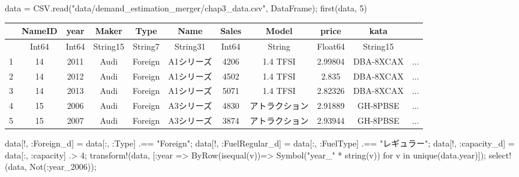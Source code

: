 \documentclass[
  letterpaper,
  DIV=11,
  numbers=noendperiod]{scrreprt}
\newenvironment{Shaded}{\begin{snugshade}}{\end{snugshade}}
\newcommand{\DataTypeTok}[1]{\textcolor[rgb]{0.68,0.00,0.00}{#1}}
\newcommand{\FloatTok}[1]{\textcolor[rgb]{0.68,0.00,0.00}{#1}}
\newcommand{\FunctionTok}[1]{\textcolor[rgb]{0.28,0.35,0.67}{#1}}
\newcommand{\KeywordTok}[1]{\textcolor[rgb]{0.00,0.23,0.31}{#1}}
\newcommand{\NormalTok}[1]{\textcolor[rgb]{0.00,0.23,0.31}{#1}}
\newcommand{\OperatorTok}[1]{\textcolor[rgb]{0.37,0.37,0.37}{#1}}
\newcommand{\StringTok}[1]{\textcolor[rgb]{0.13,0.47,0.30}{#1}}
\begin{document}
\begin{Shaded}
\begin{Highlighting}[]
\NormalTok{data }\OperatorTok{=}\NormalTok{ CSV.}\FunctionTok{read}\NormalTok{(}\StringTok{"data/demand\_estimation\_merger/chap3\_data.csv"}\NormalTok{, DataFrame);}
\FunctionTok{first}\NormalTok{(data, }\FloatTok{5}\NormalTok{)}
\end{Highlighting}
\end{Shaded}

\begin{tabular}{r|cccccccccc}
    & NameID & year & Maker & Type & Name & Sales & Model & price & kata & \\
    \hline
    & Int64 & Int64 & String15 & String7 & String31 & Int64 & String & Float64 & String15 & \\
    \hline
    1 & 14 & 2011 & Audi & Foreign & A1シリーズ & 4206 & 1.4 TFSI & 2.99804 & DBA-8XCAX & $\dots$ \\
    2 & 14 & 2012 & Audi & Foreign & A1シリーズ & 4502 & 1.4 TFSI & 2.835 & DBA-8XCAX & $\dots$ \\
    3 & 14 & 2013 & Audi & Foreign & A1シリーズ & 5071 & 1.4 TFSI & 2.82326 & DBA-8XCAX & $\dots$ \\
    4 & 15 & 2006 & Audi & Foreign & A3シリーズ & 4830 & アトラクション & 2.91889 & GH-8PBSE & $\dots$ \\
    5 & 15 & 2007 & Audi & Foreign & A3シリーズ & 3874 & アトラクション & 2.93944 & GH-8PBSE & $\dots$ \\
\end{tabular}

\begin{Shaded}
\begin{Highlighting}[]
\NormalTok{data[!, }\OperatorTok{:}\NormalTok{Foreign\_d] }\OperatorTok{=}\NormalTok{ data[}\OperatorTok{:}\NormalTok{, }\OperatorTok{:}\DataTypeTok{Type}\NormalTok{] }\OperatorTok{.==} \StringTok{"Foreign"}\NormalTok{;}
\NormalTok{data[!, }\OperatorTok{:}\NormalTok{FuelRegular\_d] }\OperatorTok{=}\NormalTok{ data[}\OperatorTok{:}\NormalTok{, }\OperatorTok{:}\NormalTok{FuelType] }\OperatorTok{.==} \StringTok{"レギュラー"}\NormalTok{;}
\NormalTok{data[!, }\OperatorTok{:}\NormalTok{capacity\_d] }\OperatorTok{=}\NormalTok{ data[}\OperatorTok{:}\NormalTok{, }\OperatorTok{:}\NormalTok{capacity] }\OperatorTok{.\textgreater{}} \FloatTok{4}\NormalTok{;}
\FunctionTok{transform!}\NormalTok{(data, [}\OperatorTok{:}\NormalTok{year }\OperatorTok{=\textgreater{}} \FunctionTok{ByRow}\NormalTok{(}\FunctionTok{isequal}\NormalTok{(v))}\OperatorTok{=\textgreater{}} \FunctionTok{Symbol}\NormalTok{(}\StringTok{"year\_"} \OperatorTok{*} \FunctionTok{string}\NormalTok{(v)) for v }\KeywordTok{in} \FunctionTok{unique}\NormalTok{(data.year)]);}
\FunctionTok{select!}\NormalTok{(data, }\FunctionTok{Not}\NormalTok{(}\OperatorTok{:}\NormalTok{year\_2006));}
\end{Highlighting}
\end{Shaded}
\end{document}
